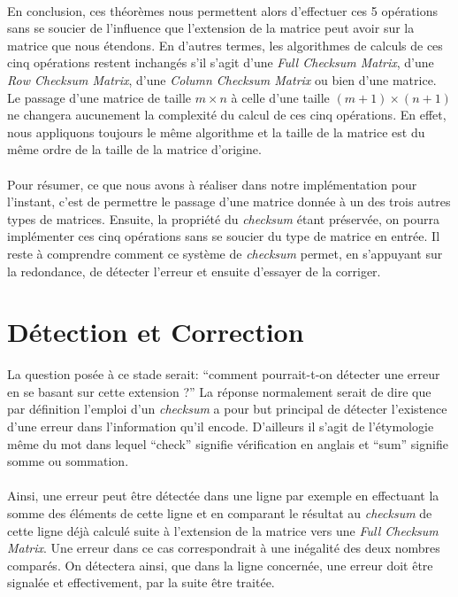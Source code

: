 \documentclass[a4paper, 10pt]{report}
\begin{document}
\paragraph*{}
En conclusion, ces théorèmes nous permettent alors d’effectuer ces 5 opérations sans se soucier de l’influence 
que l’extension de la matrice peut avoir sur la matrice que nous étendons. En d’autres termes,  les algorithmes 
de calculs de ces cinq opérations restent inchangés s’il s’agit d’une \textit{Full Checksum Matrix}, d’une 
\textit{Row Checksum Matrix}, d’une \textit{Column Checksum Matrix} ou bien d’une matrice.\newline
Le passage d’une matrice de taille $m \times n$ à celle d’une taille $(m+1) \times (n+1)$ ne changera aucunement 
la complexité du calcul de ces cinq opérations. En effet, nous appliquons toujours le même algorithme et la taille 
de la matrice est du même ordre de la taille de la matrice d’origine.
\paragraph*{}
Pour résumer, ce que nous avons à réaliser dans notre implémentation pour l’instant, c'est de permettre le passage
d’une matrice donnée à un des trois autres types de matrices. Ensuite, la propriété du \textit{checksum} 
étant préservée, on pourra implémenter ces cinq opérations sans se soucier du type de matrice en entrée.\newline
Il reste à comprendre comment ce système de \textit{checksum}  permet, en s’appuyant sur la redondance, de détecter 
l’erreur et ensuite d’essayer de la corriger.

\section{Détection et Correction}
La question posée à ce stade serait: ``comment pourrait-t-on détecter une erreur en se basant sur cette extension ?''
La réponse normalement serait de dire que par définition l’emploi d’un \textit{checksum} a pour but principal de 
détecter l’existence d’une erreur dans l’information qu’il encode. D’ailleurs il s’agit de l’étymologie même du mot 
dans lequel ``check'' signifie vérification en anglais et ``sum'' signifie somme ou sommation.
\paragraph*{} 
Ainsi, une erreur peut être détectée dans une ligne par exemple en effectuant la somme des éléments de cette ligne 
et en comparant le résultat au \textit{checksum} de cette ligne déjà calculé suite à l’extension de la matrice vers 
une \textit{Full Checksum Matrix}. Une erreur dans ce cas correspondrait à une inégalité des deux nombres comparés. 
On détectera ainsi, que dans la ligne concernée, une erreur doit être signalée et effectivement, par la suite être traitée.
\end{document}
